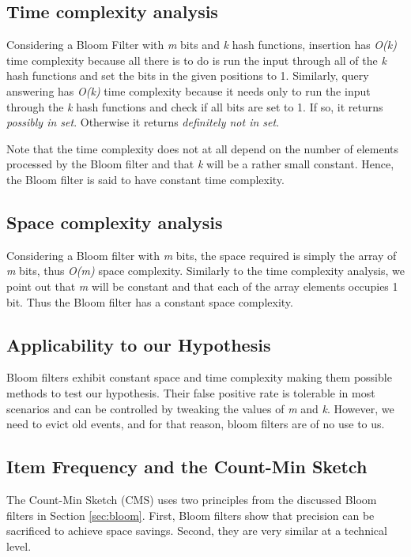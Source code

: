\subsection*{Time complexity analysis}
Considering a Bloom Filter with \textit{m} bits and \textit{k} hash functions, insertion has \textit{O(k)} time complexity because all there is to do is run the input through all of the \textit{k} hash functions and set the bits in the given positions to 1. Similarly, query answering has \textit{O(k)} time complexity because it needs only to run the input through the \textit{k} hash functions and check if all bits are set to 1. If so, it returns \textit{possibly in set}. Otherwise it returns \textit{definitely not in set}. 

Note that the time complexity does not at all depend on the number of elements processed by the Bloom filter and that \textit{k} will be a rather small constant. Hence, the Bloom filter is said to have constant time complexity.

\subsection*{Space complexity analysis}
Considering a Bloom filter with \textit{m} bits, the space required is simply the array of \textit{m} bits, thus \textit{O(m)} space complexity. Similarly to the time complexity analysis, we point out that \textit{m} will be constant and that each of the array elements occupies 1 bit. Thus the Bloom filter has a constant space complexity.

\subsection*{Applicability to our Hypothesis}
Bloom filters exhibit constant space and time complexity making them possible methods to test our hypothesis. Their false positive rate is tolerable in most scenarios and can be controlled by tweaking the values of \textit{m} and \textit{k}. However, we need to evict old events, and for that reason, bloom filters are of no use to us.

\subsection{Item Frequency and the Count-Min Sketch}
The Count-Min Sketch (CMS) uses two principles from the discussed Bloom filters in Section \ref{sec:bloom}. First, Bloom filters show that precision can be sacrificed to achieve space savings. Second, they are very similar at a technical level.

